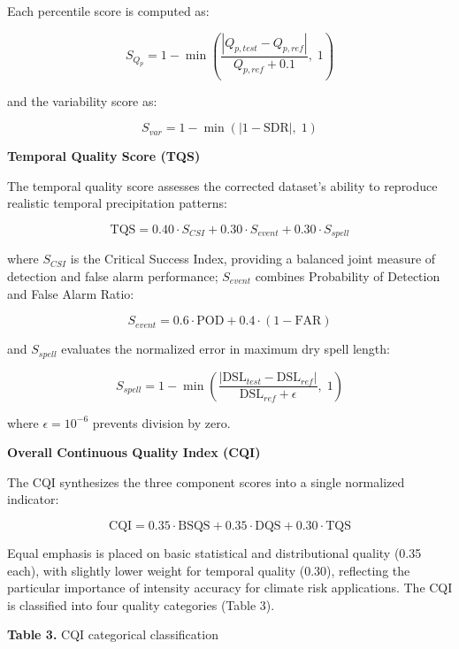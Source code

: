 \documentclass[
]{article}
\begin{document}
Each percentile score is computed as:

\[S_{Q_p} = 1 - \min\left(\frac{|Q_{p,test} - Q_{p,ref}|}{Q_{p,ref} + 0.1}, \; 1\right)\]

and the variability score as:

\[S_{var} = 1 - \min(|1 - \text{SDR}|, \; 1)\]

\textbf{Temporal Quality Score (TQS)}

The temporal quality score assesses the corrected dataset's ability to
reproduce realistic temporal precipitation patterns:

\[\text{TQS} = 0.40 \cdot S_{CSI} + 0.30 \cdot S_{event} + 0.30 \cdot S_{spell}\]

where \(S_{CSI}\) is the Critical Success Index, providing a balanced
joint measure of detection and false alarm performance; \(S_{event}\)
combines Probability of Detection and False Alarm Ratio:

\[S_{event} = 0.6 \cdot \text{POD} + 0.4 \cdot (1 - \text{FAR})\]

and \(S_{spell}\) evaluates the normalized error in maximum dry spell
length:

\[S_{spell} = 1 - \min\left(\frac{|\text{DSL}_{test} - \text{DSL}_{ref}|}{\text{DSL}_{ref} + \epsilon}, \; 1\right)\]

where \(\epsilon = 10^{-6}\) prevents division by zero.

\textbf{Overall Continuous Quality Index (CQI)}

The CQI synthesizes the three component scores into a single normalized
indicator:

\[\text{CQI} = 0.35 \cdot \text{BSQS} + 0.35 \cdot \text{DQS} + 0.30 \cdot \text{TQS}\]

Equal emphasis is placed on basic statistical and distributional quality
(0.35 each), with slightly lower weight for temporal quality (0.30),
reflecting the particular importance of intensity accuracy for climate
risk applications. The CQI is classified into four quality categories
(Table 3).

\textbf{Table 3.} CQI categorical classification
\end{document}
